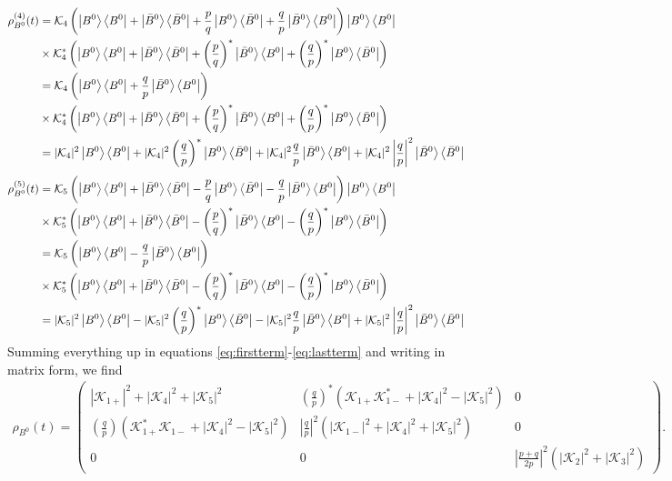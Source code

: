 \begin{align}
\rho_{B^0}^{(4)}(t) &= \mathcal{K}_{4}\left(\ket{B^0}\bra{B^0} + \ket{\bar{B}^0}\bra{\bar{B}^0} + \frac{p}{q}\ket{B^0}\bra{\bar{B}^0}+\frac{q}{p} \ket{\bar{B}^0}\bra{B^0}\right)\ket{B^0}\bra{B^0}\nonumber\\
& \times \mathcal{K}^*_{4}\left(\ket{B^0}\bra{B^0} + \ket{\bar{B}^0}\bra{\bar{B}^0} + \left(\frac{p}{q}\right)^*\ket{\bar{B}^0}\bra{B^0}+\left(\frac{q}{p}\right)^* \ket{B^0}\bra{\bar{B}^0}\right) \nonumber\\
&= \mathcal{K}_{4}\left(\ket{B^0}\bra{B^0}+\frac{q}{p}\ket{\bar{B}^0}\bra{B^0}\right)\nonumber \\
& \times \mathcal{K}_{4}^*\left(\ket{B^0}\bra{B^0}+\ket{\bar{B}^0}\bra{\bar{B}^0}+\left(\frac{p}{q}\right)^*\ket{\bar{B}^0}\bra{B^0}+\left(\frac{q}{p}\right)^*\ket{B^0}\bra{\bar{B}^0}\right)\nonumber\\
&=|\mathcal{K}_{4}|^2\ket{B^0}\bra{B^0}+|\mathcal{K}_{4}|^2\left(\frac{q}{p}\right)^*\ket{B^0}\bra{\bar{B}^0} +|\mathcal{K}_{4}|^2\frac{q}{p}\ket{\bar{B}^0}\bra{B^0}+|\mathcal{K}_{4}|^2\left|\frac{q}{p}\right|^2\ket{\bar{B}^0}\bra{\bar{B}^0}
\end{align}
\begin{align}
\rho_{B^0}^{(5)}(t) &= \mathcal{K}_{5}\left(\ket{B^0}\bra{B^0} + \ket{\bar{B}^0}\bra{\bar{B}^0} - \frac{p}{q}\ket{B^0}\bra{\bar{B}^0}-\frac{q}{p} \ket{\bar{B}^0}\bra{B^0}\right)\ket{B^0}\bra{B^0}\nonumber\\
& \times \mathcal{K}^*_{5}\left(\ket{B^0}\bra{B^0} + \ket{\bar{B}^0}\bra{\bar{B}^0} - \left(\frac{p}{q}\right)^*\ket{\bar{B}^0}\bra{B^0}-\left(\frac{q}{p}\right)^* \ket{B^0}\bra{\bar{B}^0}\right) \nonumber\\
&= \mathcal{K}_{5}\left(\ket{B^0}\bra{B^0}-\frac{q}{p}\ket{\bar{B}^0}\bra{B^0}\right)\nonumber \\
& \times \mathcal{K}_{5}^*\left(\ket{B^0}\bra{B^0}+\ket{\bar{B}^0}\bra{\bar{B}^0}-\left(\frac{p}{q}\right)^*\ket{\bar{B}^0}\bra{B^0}-\left(\frac{q}{p}\right)^*\ket{B^0}\bra{\bar{B}^0}\right)\nonumber\\
\label{eq:lastterm}
&=|\mathcal{K}_{5}|^2\ket{B^0}\bra{B^0}-|\mathcal{K}_{5}|^2\left(\frac{q}{p}\right)^*\ket{B^0}\bra{\bar{B}^0} -|\mathcal{K}_{5}|^2\frac{q}{p}\ket{\bar{B}^0}\bra{B^0}+|\mathcal{K}_{5}|^2\left|\frac{q}{p}\right|^2\ket{\bar{B}^0}\bra{\bar{B}^0}
\end{align}
Summing everything up in equations \ref{eq:firstterm}-\ref{eq:lastterm} and writing in matrix form, we find
\begin{align}
\label{eq:bstate}
\rho_{B^0}(t) = \begin{pmatrix} |\mathcal{K}_{1+}|^2 + |\mathcal{K}_4|^2 + |\mathcal{K}_5|^2 & \left(\frac{q}{p}\right)^*\left(\mathcal{K}_{1+}\mathcal{K}_{1-}^*+|\mathcal{K}_4|^2-|\mathcal{K}_5|^2\right) & 0 \\
\left(\frac{q}{p}\right)\left(\mathcal{K}_{1+}^*\mathcal{K}_{1-}+|\mathcal{K}_4|^2-|\mathcal{K}_5|^2\right) & \left|\frac{q}{p}\right|^2\left(|\mathcal{K}_{1-}|^2 + |\mathcal{K}_4|^2 + |\mathcal{K}_5|^2 \right) & 0 \\
0 & 0 & \left|\frac{p+q}{2p}\right|^2(|\mathcal{K}_2|^2 + |\mathcal{K}_3|^2) \end{pmatrix}.
\end{align}

